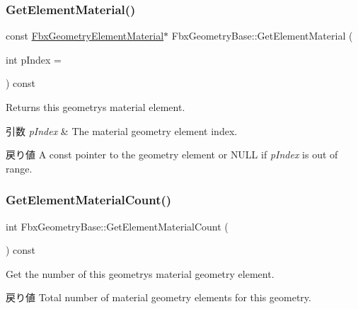 \subsubsection{\texorpdfstring{Get\+Element\+Material()}{GetElementMaterial()}\hspace{0.1cm}{\footnotesize\ttfamily [2/2]}}
{\footnotesize\ttfamily const \hyperlink{fbxlayer_8h_a1a779f3f614dbf0024c07f4a1d8332f4}{Fbx\+Geometry\+Element\+Material}$\ast$ Fbx\+Geometry\+Base\+::\+Get\+Element\+Material (\begin{DoxyParamCaption}\item[{int}]{p\+Index = {} }\end{DoxyParamCaption}) const}

Returns this geometry\textquotesingle{}s material element. 
\begin{DoxyParams}{引数}
{\em p\+Index} & The material geometry element index. \\
\hline
\end{DoxyParams}
\begin{DoxyReturn}{戻り値}
A const pointer to the geometry element or {\ttfamily N\+U\+LL} if {\itshape p\+Index} is out of range. 
\end{DoxyReturn}
\mbox{\label{class_fbx_geometry_base_a443797935c203b51edb4004907613017}} 
\subsubsection{\texorpdfstring{Get\+Element\+Material\+Count()}{GetElementMaterialCount()}}
{\footnotesize\ttfamily int Fbx\+Geometry\+Base\+::\+Get\+Element\+Material\+Count (\begin{DoxyParamCaption}{ }\end{DoxyParamCaption}) const}

Get the number of this geometry\textquotesingle{}s material geometry element. \begin{DoxyReturn}{戻り値}
Total number of material geometry elements for this geometry. 
\end{DoxyReturn}
\mbox{\label{class_fbx_geometry_base_ab7486b08caa6e90923fbb194bd81a61e}} 
